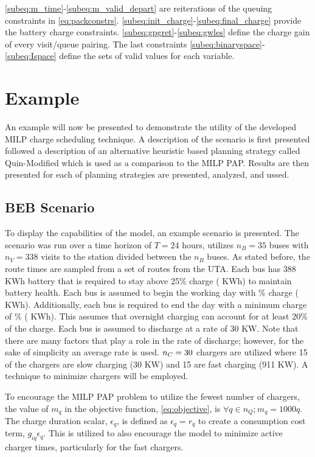 \documentclass[utf8]{FrontiersinHarvard}
\newcommand{\A}{35 }                                                            %
\newcommand{\N}{338 }                                                           %
\newcommand{\acharge}{0.9}                                                      %
\newcommand{\bcharge}{0.7 }                                                     %
\newcommand{\mincharge}{25\% }                                                  %
\newcommand{\minchargeD}{0.25 }                                                 %
\newcommand{\batsize}{388 }                                                     %
\newcommand{\fast}{15 }                                                         %
\newcommand{\slow}{15 }                                                         %
\newcommand{\fasts}{911 }                                                       %
\newcommand{\slows}{30 }                                                        %
\begin{document}
\autoref{subeq:m_time}-\autoref{subeq:m_valid_depart} are reiterations of the queuing constraints in
\autoref{eq:packconstrs}. \autoref{subeq:init_charge}-\autoref{subeq:final_charge} provide the battery charge
constraints. \autoref{subeq:gpgret}-\autoref{subeq:gwles} define the charge gain of every visit/queue
pairing. The last constraints \autoref{subeq:binaryspace}-\autoref{subeq:Ispace} define the sets of valid values for each
variable.
\section{Example}
\label{sec:example}
An example will now be presented to demonstrate the utility of the developed MILP charge scheduling technique. A
description of the scenario is first presented followed a description of an alternative heuristic based planning
strategy called Quin-Modified which is used as a comparison to the MILP PAP. Results are then presented for each of
planning strategies are presented, analyzed, and ussed.

\subsection{BEB Scenario}
\label{beb-scenario}
To display the capabilities of the model, an example scenario is presented. The scenario was run over a time horizon of
\(T=24\) hours, utilizes \(n_B = \A\) buses with \(n_V = \N\) visits to the station divided between the \(n_B\) buses. As stated
before, the route times are sampled from a set of routes from the UTA. Each bus has \batsize KWh battery that is
required to stay above \mincharge charge (\fpeval{\batsize * \minchargeD} KWh) to maintain battery health. Each bus is
assumed to begin the working day with \fpeval{\acharge*100}\% charge (\fpeval{\acharge * \batsize} KWh). Additionally,
each bus is required to end the day with a minimum charge of \fpeval{\bcharge * 100}\% (\fpeval{\bcharge * \batsize}
KWh). This assumes that overnight charging can account for at least 20\% of the charge. Each bus is assumed to discharge
at a rate of 30 KW. Note that there are many factors that play a role in the rate of discharge; however, for the sake of
simplicity an average rate is used. \(n_C = \fpeval{\fast + \slow}\) chargers are utilized where \slow of the chargers are
slow charging (\slows KW) and \fast are fast charging (\fasts KW). A technique to minimize chargers will be employed.

To encourage the MILP PAP problem to utilize the fewest number of chargers, the value of \(m_q\) in the objective
function, \autoref{eq:objective}, is \(\forall q \in n_Q; m_q = 1000q\). The charge duration scalar, \(\epsilon_q\), is defined as
\(\epsilon_q = r_q\) to create a consumption cost term, \(g_{iq}\epsilon_q\). This is utilized to also encourage the model to minimize
active charger times, particularly for the fast chargers.
\end{document}
